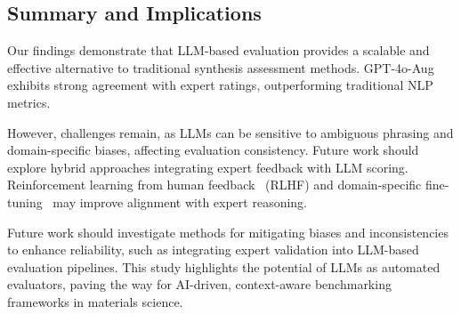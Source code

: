 

\subsection{Summary and Implications}
\label{subsec:summary_implications}

Our findings demonstrate that LLM-based evaluation provides a scalable and effective alternative to traditional synthesis assessment methods. GPT-4o-Aug exhibits strong agreement with expert ratings, outperforming traditional NLP metrics. 

However, challenges remain, as LLMs can be sensitive to ambiguous phrasing and domain-specific biases, affecting evaluation consistency. Future work should explore hybrid approaches integrating expert feedback with LLM scoring. Reinforcement learning from human feedback~\cite{ouyang2022training} (RLHF) and domain-specific fine-tuning~\cite{anisuzzaman2025fine} may improve alignment with expert reasoning.

Future work should investigate methods for mitigating biases and inconsistencies to enhance reliability, such as integrating expert validation into LLM-based evaluation pipelines. This study highlights the potential of LLMs as automated evaluators, paving the way for AI-driven, context-aware benchmarking frameworks in materials science.



